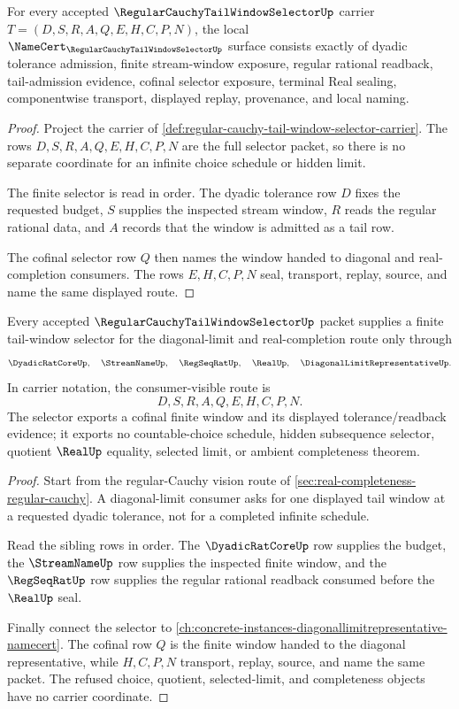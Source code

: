 \begin{theorem}
\label{thm:regular-cauchy-tail-window-selector-namecert-obligations}
For every accepted $\RegularCauchyTailWindowSelectorUp$ carrier $T=(D,S,R,A,Q,E,H,C,P,N)$, the local $\NameCert_{\RegularCauchyTailWindowSelectorUp}$ surface consists exactly of dyadic tolerance admission, finite stream-window exposure, regular rational readback, tail-admission evidence, cofinal selector exposure, terminal Real sealing, componentwise transport, displayed replay, provenance, and local naming.
\end{theorem}
\begin{proof}
Project the carrier of \autoref{def:regular-cauchy-tail-window-selector-carrier}. The rows $D,S,R,A,Q,E,H,C,P,N$ are the full selector packet, so there is no separate coordinate for an infinite choice schedule or hidden limit.

The finite selector is read in order. The dyadic tolerance row $D$ fixes the requested budget, $S$ supplies the inspected stream window, $R$ reads the regular rational data, and $A$ records that the window is admitted as a tail row.

The cofinal selector row $Q$ then names the window handed to diagonal and real-completion consumers. The rows $E,H,C,P,N$ seal, transport, replay, source, and name the same displayed route.
\end{proof}

\begin{theorem}
\label{thm:regular-cauchy-tail-window-selector-route}
Every accepted $\RegularCauchyTailWindowSelectorUp$ packet supplies a finite tail-window selector for the diagonal-limit and real-completion route only through
$$
\DyadicRatCoreUp,\quad \StreamNameUp,\quad \RegSeqRatUp,\quad \RealUp,\quad \DiagonalLimitRepresentativeUp .
$$
In carrier notation, the consumer-visible route is
$$
D,S,R,A,Q,E,H,C,P,N .
$$
The selector exports a cofinal finite window and its displayed tolerance/readback evidence; it exports no countable-choice schedule, hidden subsequence selector, quotient $\RealUp$ equality, selected limit, or ambient completeness theorem.
\end{theorem}
\begin{proof}
Start from the regular-Cauchy vision route of \autoref{sec:real-completeness-regular-cauchy}. A diagonal-limit consumer asks for one displayed tail window at a requested dyadic tolerance, not for a completed infinite schedule.

Read the sibling rows in order. The $\DyadicRatCoreUp$ row supplies the budget, the $\StreamNameUp$ row supplies the inspected finite window, and the $\RegSeqRatUp$ row supplies the regular rational readback consumed before the $\RealUp$ seal.

Finally connect the selector to \autoref{ch:concrete-instances-diagonallimitrepresentative-namecert}. The cofinal row $Q$ is the finite window handed to the diagonal representative, while $H,C,P,N$ transport, replay, source, and name the same packet. The refused choice, quotient, selected-limit, and completeness objects have no carrier coordinate.
\end{proof}

